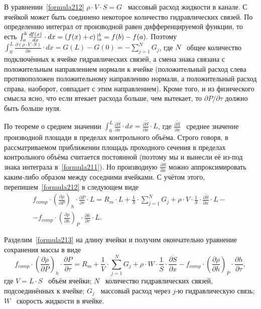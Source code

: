 В уравнении~\eqref{formula212} $\rho\cdot V\cdot S = G$ \textthreequartersemdash\ массовый расход жидкости в канале. С ячейкой может быть соединено некоторое количество гидравлических связей. По определению интеграл от производной равен дифференцируемой функции, то есть $\int_{a}^{b} \frac{df(x)}{dx} \cdot dx = \left(f(x)+c\right)|_{a}^{b}\\=f(b)-f(a).$ Поэтому $\int_{0}^{L} \frac{\partial(\rho\cdot V\cdot S)}{\partial x} \cdot dx = G(L) - G(0) = -\sum_{j=1}^{N} G_j$, где $N$ \textthreequartersemdash\ общее количество подключённых к ячейке гидравлических связей, а смена знака связана с положительным направлением нормали к ячейке (положительный расход слева противоположен положительному направлению нормали, а положительный расход справа, наоборот, совпадает с этим направлением). Кроме того, и из физического смысла ясно, что если втекает расхода больше, чем вытекает, то $\partial P / \partial\tau$ должно быть больше нуля. 

По теореме о среднем значении $\int_{0}^{L} \frac{\partial S}{\partial x} \cdot dx = \overline{\frac{\partial S}{\partial x}} \cdot L$, где $\overline{\frac{\partial S}{\partial x}}$ \textthreequartersemdash\ среднее значение производной площади в пределах контрольного объёма. Строго говоря, в рассматриваемом приближении площадь проходного сечения в пределах контрольного объёма считается постоянной (поэтому мы и вынесли её из-под знака интеграла в~\eqref{formula211}). Но производную $\frac{\partial S}{\partial x}$ можно аппроксимировать каким-либо образом между соседними ячейками. С учётом этого, перепишем~\eqref{formula212} в следующем виде
\begin{eqnarray}
\label{formula213}
f_{comp}\cdot\left(\frac{\partial\rho}{\partial P}\right)_{h}\cdot \frac{\partial P}{\partial\tau} \cdot L=
R_m \cdot L + \frac 1 S \cdot \sum_{j=1}^{N} G_j + \rho\cdot V \cdot \frac 1 S \cdot \overline{\frac{\partial S}{\partial x}} \cdot L - \nonumber ~\\ 
-f_{comp}\cdot \left(\frac{\partial\rho}{\partial h}\right)_{P}\cdot \frac{\partial h}{\partial\tau} \cdot L.
\end{eqnarray}

Разделим~\eqref{formula213} на длину ячейки и получим окончательно уравнение сохранения массы в виде
\begin{equation}
\label{formula214}
\boxed{f_{comp}\cdot\left(\frac{\partial\rho}{\partial P}\right)_{h}\cdot \frac{\partial P}{\partial\tau} =
R_m + \frac 1 V \cdot \sum_{j=1}^{N} G_j + \rho\cdot W \cdot \frac 1 S \cdot \overline{\frac{\partial S}{\partial x}} - f_{comp}\cdot\left(\frac{\partial\rho}{\partial h}\right)_{P}\cdot \frac{\partial h}{\partial\tau}}
,
\end{equation}
где $V = L \cdot S$ \textthreequartersemdash\ объём ячейки; $N$ \textthreequartersemdash\ количество гидравлических связей, подсоединённых к ячейке; $G_j$ \textthreequartersemdash\ массовый расход через $j$-ю гидравлическую связь; $W$ \textthreequartersemdash\ скорость жидкости в ячейке. 




        
